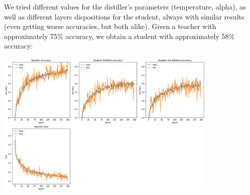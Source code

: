 We tried different values for the distiller's parameters (temperature, alpha), as well as different layers dispositions for the student, always with similar results
(even getting worse accuracies, but both alike). Given a teacher with approximately 75\% accuracy, we obtain a student with approximately 58\% accuracy:
\begin{center}
    \captionsetup{type=figure}
    \includegraphics[width=400px]{sections/exp-1/images/distiller-acc.png}
\end{center}